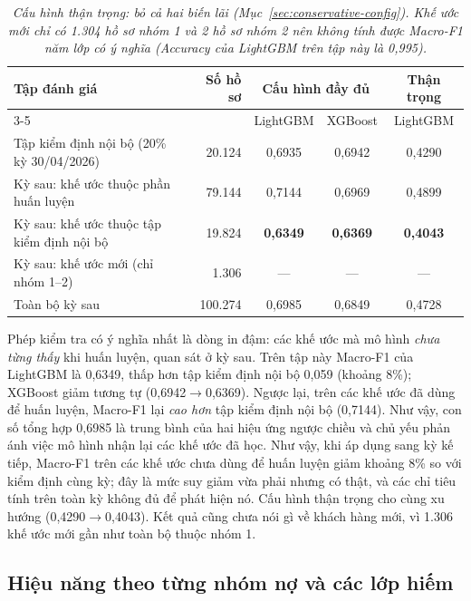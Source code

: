 \begin{table}[H]
\centering
\caption{Macro-F1 trên kỳ 31/05/2026 theo tập con khế ước --- bộ B}
\label{tab:holdout-subsets}
\begin{tabular}{|l|r|c|c|c|}
\hline
\multirow{2}{*}{Tập đánh giá} & \multirow{2}{*}{Số hồ sơ} & \multicolumn{2}{c|}{Cấu hình đầy đủ} & Thận trọng\\
\cline{3-5}
 & & LightGBM & XGBoost & LightGBM\\
\hline
Tập kiểm định nội bộ (20\% kỳ 30/04/2026) & 20.124 & 0,6935 & 0,6942 & 0,4290\\
\hline
Kỳ sau: khế ước thuộc phần huấn luyện & 79.144 & 0,7144 & 0,6969 & 0,4899\\
Kỳ sau: khế ước thuộc tập kiểm định nội bộ & 19.824 & \textbf{0,6349} & \textbf{0,6369} & \textbf{0,4043}\\
Kỳ sau: khế ước mới (chỉ nhóm 1--2) & 1.306 & --- & --- & ---\\
\hline
Toàn bộ kỳ sau & 100.274 & 0,6985 & 0,6849 & 0,4728\\
\hline
\end{tabular}
\caption*{\textit{Cấu hình thận trọng: bỏ cả hai biến lãi (Mục~\ref{sec:conservative-config}). Khế ước mới chỉ có 1.304 hồ sơ nhóm 1 và 2 hồ sơ nhóm 2 nên không tính được Macro-F1 năm lớp có ý nghĩa (Accuracy của LightGBM trên tập này là 0,995).}}
\end{table}

Phép kiểm tra có ý nghĩa nhất là dòng in đậm: các khế ước mà mô hình \emph{chưa từng thấy} khi huấn luyện, quan sát ở kỳ sau. Trên tập này Macro-F1 của LightGBM là 0,6349, thấp hơn tập kiểm định nội bộ 0,059 (khoảng 8\%); XGBoost giảm tương tự (0,6942$\to$0,6369). Ngược lại, trên các khế ước đã dùng để huấn luyện, Macro-F1 lại \emph{cao hơn} tập kiểm định nội bộ (0,7144). Như vậy, con số tổng hợp 0,6985 là trung bình của hai hiệu ứng ngược chiều và chủ yếu phản ánh việc mô hình nhận lại các khế ước đã học. Như vậy, khi áp dụng sang kỳ kế tiếp, Macro-F1 trên các khế ước chưa dùng để huấn luyện giảm khoảng 8\% so với kiểm định cùng kỳ; đây là mức suy giảm vừa phải nhưng có thật, và các chỉ tiêu tính trên toàn kỳ không đủ để phát hiện nó. Cấu hình thận trọng cho cùng xu hướng (0,4290$\to$0,4043). Kết quả cũng chưa nói gì về khách hàng mới, vì 1.306 khế ước mới gần như toàn bộ thuộc nhóm 1.

\subsection{Hiệu năng theo từng nhóm nợ và các lớp hiếm}
\label{sec:res-b-byclass}

